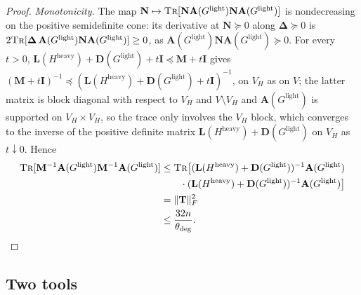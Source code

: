 \documentclass[11pt]{article}
\theoremstyle{remark}
\renewcommand{\AA}{\mathbf A}
\newcommand{\DD}{\mathbf D}
\newcommand{\II}{\mathbf I}
\newcommand{\LL}{\mathbf L}
\newcommand{\MM}{\mathbf M}
\newcommand{\NN}{\mathbf N}
\newcommand{\TT}{\mathbf T}
\newcommand{\dheavy}{\theta_{\deg}}
\newcommand{\Gl}{G^{\mathrm{light}}}
\newcommand{\norm}[1]{\lVert#1\rVert}
\newcommand{\tr}{\textsc{Tr}}
\begin{document}
\begin{proof}
\emph{Monotonicity.}
The map $\NN\mapsto\tr[\NN\AA(\Gl)\NN\AA(\Gl)]$ is nondecreasing on the
positive semidefinite cone: its derivative at $\NN\succeq0$ along
$\boldsymbol\Delta\succeq0$ is
$2\tr[\boldsymbol\Delta\,\AA(\Gl)\NN\AA(\Gl)]\ge0$, as
$\AA(\Gl)\NN\AA(\Gl)\succeq0$.
For every $t>0$,
$\LL(H^{\mathrm{heavy}})+\DD(\Gl)+t\II\preceq\MM+t\II$ gives
$(\MM+t\II)^{-1}\preceq(\LL(H^{\mathrm{heavy}})+\DD(\Gl)+t\II)^{-1}$, on
$V_H$ as on $V$; the latter matrix is block diagonal with respect to
$V_H$ and $V\setminus V_H$ and $\AA(\Gl)$ is supported on $V_H\times V_H$,
so the trace only involves the $V_H$ block, which converges to the inverse
of the positive definite matrix $\LL(H^{\mathrm{heavy}})+\DD(\Gl)$ on $V_H$
as $t\downarrow0$.
Hence
\begin{align*}
\tr[\MM^{-1}\AA(\Gl)\MM^{-1}\AA(\Gl)]
&\le\tr\bigl[(\LL(H^{\mathrm{heavy}})+\DD(\Gl))^{-1}\AA(\Gl)\\
&\qquad\cdot(\LL(H^{\mathrm{heavy}})+\DD(\Gl))^{-1}\AA(\Gl)\bigr]\\
&=\norm{\TT}_F^{2}\\
&\le\frac{32n}{\dheavy}.
\qedhere
\end{align*}
\end{proof}

\subsection{Two tools}
\end{document}
